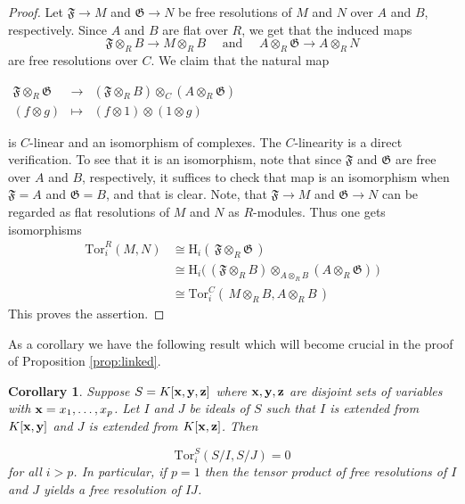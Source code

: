 \documentclass{amsart}
\newtheorem{corollary}[theorem]{Corollary}
\theoremstyle{definition}
\numberwithin{equation}{section}
\def\to{\longrightarrow}
\def\mapsto{\longmapsto}
\def\x{\bf{x}}
\def\y{\bf{y}}
\def\z{\bf{z}}
\def\fF{\mathfrak{F}}
\def\fG{\mathfrak{G}}
\begin{document}
\begin{proof}
 Let $\fF \to M$ and $\fG \to N$ be free resolutions of $M$ and $N$ over $A$ and $B$, respectively. 
 Since $A$ and $B$ are flat over $R$, we get that the induced maps
 \[
 \fF\otimes_R B\longrightarrow M\otimes_R B \quad\text{ and }\quad A\otimes_R \fG \longrightarrow A\otimes_R N
 \]
 are free resolutions over $C$. We claim that the natural map

 \begin{center}
 $\begin{array}{ccc}
 \fF \otimes_R \fG & \longrightarrow & (\fF \otimes_R B) \otimes_{C} (A \otimes_R \fG) \\
 (f\otimes g) &  \mapsto & (f\otimes 1)\otimes (1\otimes g)
 \end{array}$
 \end{center}
 
 \noindent is $C$-linear and an isomorphism of complexes. The $C$-linearity is a direct verification. To see that it is an isomorphism, note that since $\fF$ and $\fG$ are free over $A$ and $B$, respectively, it suffices to check that map is an isomorphism when $\fF=A$ and $\fG=B$, and that is clear. Note, that $\fF\to M$ and $\fG\to N$ can be regarded as flat resolutions of $M$ and $N$ as $R$-modules. Thus  one gets isomorphisms
 \begin{align*}
 \mathrm{Tor}^R_i(M,N) 
    &\cong \mathrm{H}_i(\,\fF \otimes_R \fG\,) \\    
    &\cong \mathrm{H}_i\big(\,(\fF \otimes_R B) \otimes_{A\otimes_R B} (A\otimes_R \fG)\,\big) \\
    &\cong \mathrm{Tor}^C_i(\,M\otimes_R B, A\otimes_R B\,)
 \end{align*}
This proves the assertion. 
\end{proof}

As a corollary we have the following result which will become
crucial in the proof of Proposition \ref{prop:linked}. 

\begin{corollary} \label{cor:torvanishing}
Suppose $S=K[\x,\y,\z]$ where $\x,\y,\z$ are disjoint sets of variables with  ${\x}=x_1,\dots, x_p$. 
Let  $I$ and $J$ be ideals of $S$ such that $I$ is extended from $K[\x,\y]$ and $J$ is extended from $K[\x,\z]$. Then 

\[
\mathrm{Tor}^S_i(S/I,S/J)=0 
\]
for all $i>p$. 
In particular, if $p = 1$ then the tensor product of  
free resolutions of $I$ and $J$ yields a free resolution of $IJ$.
\end{corollary}
\end{document}
